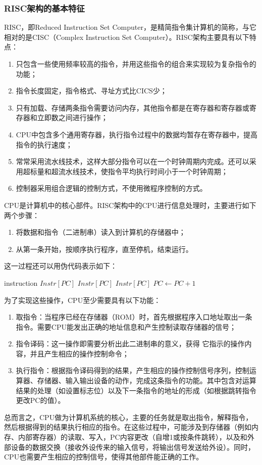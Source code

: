\documentclass[titlepage, 11pt]{article}
\begin{document}
	\subsubsection{RISC架构的基本特征}
	RISC，即Reduced Instruction Set Computer，是精简指令集计算机的简称，与它相对的是CISC（Complex Instruction Set Computer）。RISC架构主要具有以下特点：
	\begin{enumerate}
	\item 只包含一些使用频率较高的指令，并用这些指令的组合来实现较为复杂指令的功能；
	\item 指令长度固定，指令格式、寻址方式比CICS少；
	\item 只有加载、存储两条指令需要访问内存，其他指令都是在寄存器和寄存器或寄存器和立即数之间进行操作；
	\item CPU中包含多个通用寄存器，执行指令过程中的数据均暂存在寄存器中，提高指令的执行速度；
	\item 常常采用流水线技术，这样大部分指令可以在一个时钟周期内完成。还可以采用超标量和超流水线技术，使指令平均执行时间小于一个时钟周期；
	\item 控制器采用组合逻辑的控制方式，不使用微程序控制的方式。
	\end{enumerate}\par 
	CPU是计算机中的核心部件。RISC架构中的CPU进行信息处理时，主要进行如下两个步骤：
	\begin{enumerate}
		\item 将数据和指令（二进制串）读入到计算机的存储器中；
		\item 从第一条开始，按顺序执行程序，直至停机，结束运行。
	\end{enumerate}
	这一过程还可以用伪代码表示如下：
	\begin{codebox}
		\zi{}
		\li\While{}
		\Do\li{} instruction $Instr[PC]$
		\li {}  $Instr[PC]$
		\li{} $Instr[PC]$
		\li $PC\gets PC+1$
	\end{codebox}\par 
	为了实现这些操作，CPU至少需要具有以下功能：
	\begin{enumerate}
		\item 取指令：当程序已经在存储器（ROM）时，首先根据程序入口地址取出一条指令。需要CPU能发出正确的地址信息和产生控制读取存储器的信号；
		\item 指令译码：这一操作即需要分析出此二进制串的意义，获得
		它指示的操作内容，并且产生相应的操作控制命令；		
		\item 执行指令：根据指令译码得到的结果，产生相应的操作控制信号序列，控制运算器、存储器、输入输出设备的动作，完成这条指令的功能。其中包含对运算结果的处理（如设置标志位）以及下一条指令的地址的形成（如根据跳转指令更改PC的值）。
	\end{enumerate}\par 
	总而言之，CPU做为计算机系统的核心，主要的任务就是取出指令，解释指令，然后根据得到的结果执行相应的指令。在这些过程中，可能涉及到存储器（例如内存、内部寄存器）的读取、写入，PC内容更改（自增1或按条件跳转），以及和外部设备的数据交换（接收外设传来的输入信号，将输出信号发送给外设）。同时，CPU也需要产生相应的控制信号，使得其他部件能正确的工作。
\end{document}

